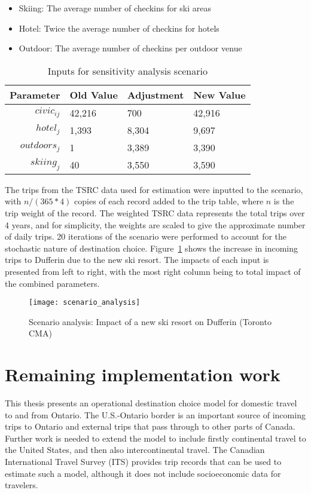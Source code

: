 \begin{minipage}{\textwidth}
\begin{itemize}
\item Skiing: The average number of checkins for ski areas
\item Hotel: Twice the average number of checkins for hotels
\item Outdoor: The average number of checkins per outdoor venue
\end{itemize}
\end{minipage}

\begin{table}[H]
\centering
\caption{Inputs for sensitivity analysis scenario}
\label{table:scenario-inputs}
\begin{tabular}{@{}rlll@{}}
  \toprule
 Parameter & Old Value & Adjustment & New Value  \\ \midrule
  $civic_{ij}$ & 42,216 & 700 & 42,916  \\ 
  $hotel_j$ & 1,393  & 8,304 & 9,697  \\ 
  $outdoors_j$  & 1 & 3,389 & 3,390  \\ 
  $skiing_j$ & 40  & 3,550 & 3,590 \\ 
   \bottomrule
\end{tabular}
\end{table}

The trips from the TSRC data used for estimation were inputted to the scenario, with $n/(365*4)$ copies of each record added to the trip table, where $n$ is the trip weight of the record. The weighted TSRC data represents the total trips over 4 years, and for simplicity, the weights are scaled to give the approximate number of daily trips. 20 iterations of the scenario were performed to account for the stochastic nature of destination choice. Figure~\ref{fig:scenario-results} shows the increase in incoming trips to Dufferin due to the new ski resort. The impacts of each input is presented from left to right, with the most right column being to total impact of the combined parameters. 

\begin{figure}[H]
\centering
\texttt{[image: scenario\_analysis]}
\caption{Scenario analysis: Impact of a new ski resort on Dufferin (Toronto CMA)}
\label{fig:scenario-results}
\end{figure}


\section{Remaining implementation work}
This thesis presents an operational destination choice model for domestic travel to and from Ontario. The U.S.-Ontario border is an important source of incoming trips to Ontario and external trips that pass through to other parts of Canada. Further work is needed to extend the model to include firstly continental travel to the United States, and then also intercontinental travel. The Canadian International Travel Survey (ITS) provides trip records that can be used to estimate such a model, although it does not include socioeconomic data for travelers. 

